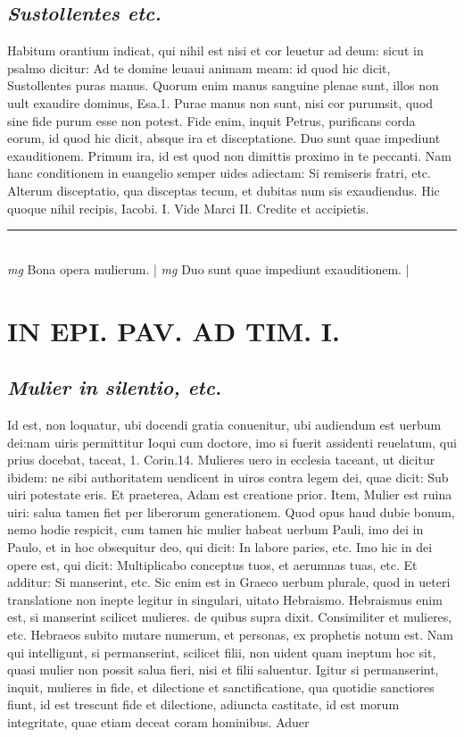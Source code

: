 \documentclass{article}
\begin{document}
\begin{pages}
\subsection*{\textit{Sustollentes etc. }}\pstart Habitum orantium indicat, qui nihil est nisi et cor leuetur ad deum: sicut in psalmo dicitur: Ad te domine leuaui animam meam: id quod hic dicit, Sustollentes puras manus. Quorum enim manus sanguine plenae sunt, illos non uult exaudire dominus, Esa.1. Purae manus non sunt, nisi cor purumsit, quod sine fide purum esse non potest. Fide enim, inquit Petrus, purificans corda eorum, id quod hic dicit, absque  ira et disceptatione. Duo sunt quae impediunt exauditionem. Primum ira, id est quod non dimittis proximo in te peccanti. Nam hanc conditionem in euangelio semper uides adiectam: Si remiseris fratri, etc. Alterum disceptatio, qua disceptas tecum, et dubitas num sis exaudiendus. Hic quoque  nihil recipis, Iacobi. I. Vide Marci II. Credite et accipietis.  \pend
\vspace{0.5cm}\noindent
\vspace{0.2cm}\rule{1cm}{0.2pt}\\ 
\hspace{0.2cm}\textit{mg}
\footnotesize Bona opera mulierum. 
\normalsize| 
\hspace{0.2cm}\textit{mg}
\footnotesize Duo sunt quae impediunt exauditionem. 
\normalsize| 
\section*{IN EPI. PAV. AD TIM. I. }
\marginpar{[ p.86 ]}
{}
\subsection*{\textit{Mulier in silentio, etc. }}\pstart Id est, non loquatur, ubi docendi gratia conuenitur, ubi audiendum est uerbum dei:nam uiris permittitur Ioqui cum doctore, imo si fuerit assidenti reuelatum, qui prius docebat, taceat, 1. Corin.14. Mulieres uero in ecclesia taceant, ut dicitur ibidem: ne sibi authoritatem uendicent in uiros contra legem dei, quae dicit: Sub uiri potestate eris. Et praeterea, Adam est creatione prior. Item, Mulier est ruina uiri: salua tamen fiet per liberorum generationem. Quod opus haud dubie bonum, nemo hodie respicit, cum tamen hic mulier habeat uerbum Pauli, imo dei in Paulo, et in hoc obsequitur deo, qui dicit: In labore paries, etc. Imo hic in dei opere est, qui dicit: Multiplicabo conceptus tuos, et aerumnas tuas, etc. Et additur: Si manserint, etc. Sic enim est in Graeco uerbum plurale, quod in ueteri translatione non inepte legitur in singulari, uitato Hebraismo. Hebraismus enim est, si manserint scilicet mulieres. de quibus supra dixit. Consimiliter et mulieres, etc. Hebraeos subito mutare numerum, et personas, ex prophetis notum est. Nam qui intelligunt, si permanserint, scilicet filii, non uident quam ineptum hoc sit, quasi mulier non possit salua fieri, nisi et filii saluentur. Igitur si permanserint, inquit, mulieres in fide, et dilectione et sanctificatione, qua quotidie sanctiores fiunt, id est trescunt fide et dilectione, adiuncta castitate, id est morum integritate, quae etiam deceat coram hominibus. Aduer\pend

\end{pages}
\end{document}
